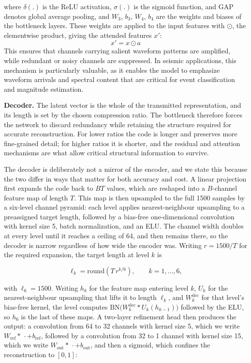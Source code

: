 \documentclass[fleqn,10pt]{wlscirep}
\begin{document}
where $\delta(.)$ is the ReLU activation, $\sigma(.)$ is the sigmoid function, and GAP denotes global average pooling, and $W_3$, $b_3$, $W_4$, $b_4$ are the weights and biases of the bottleneck layers. These weights are applied to the input features with $\odot$, the elementwise product, giving the attended features $x'$:
\begin{equation}
x' = x \odot a
\end{equation}
This ensures that channels carrying salient waveform patterns are amplified, while redundant or noisy channels are suppressed. In seismic applications, this mechanism is particularly valuable, as it enables the model to emphasize waveform arrivals and spectral content that are critical for event classification and magnitude estimation.

\textbf{Decoder.} The latent vector is the whole of the transmitted representation, and its length is set by the chosen compression ratio. The bottleneck therefore forces the network to discard redundancy while retaining the structure required for accurate reconstruction. For lower ratios the code is longer and preserves more fine-grained detail; for higher ratios it is shorter, and the residual and attention mechanisms are what allow critical structural information to survive.

The decoder is deliberately not a mirror of the encoder, and we state this because the two differ in ways that matter for both accuracy and cost. A linear projection first expands the code back to $B T$ values, which are reshaped into a $B$-channel feature map of length $T$. This map is then upsampled to the full 1500 samples by a six-level channel pyramid: each level applies nearest-neighbour upsampling to a preassigned target length, followed by a bias-free one-dimensional convolution with kernel size 5, batch normalization, and an ELU. The channel width doubles at every level until it reaches a ceiling of 64, and then remains there, so the decoder is narrow regardless of how wide the encoder was. Writing $r = 1500/T$ for the required expansion, the target length at level $k$ is

\begin{equation}
\ell_k = \mathrm{round}\!\left(T\, r^{k/6}\right), \qquad k = 1, \dots, 6,
\end{equation}

with $\ell_6 = 1500$. Writing $h_{k}$ for the feature map entering level $k$, $U_{k}$ for the nearest-neighbour upsampling that lifts it to length $\ell_{k}$, and $W^{\mathrm{dec}}_{k}$ for that level's bias-free kernel, the level computes $\mathrm{BN}\big(W^{\mathrm{dec}}_{k} \ast U_{k}(h_{k-1})\big)$ followed by the ELU, so $h_{6}$ is the last of these maps. A two-layer refinement head then produces the output: a convolution from 64 to 32 channels with kernel size 5, which we write $W_{\text{ref}} \ast\,\cdot + b_{\text{ref}}$, followed by a convolution from 32 to 1 channel with kernel size 15, which we write $W_{\text{out}} \ast\,\cdot + b_{\text{out}}$, and then a sigmoid, which confines the reconstruction to $[0,1]$:
\end{document}
